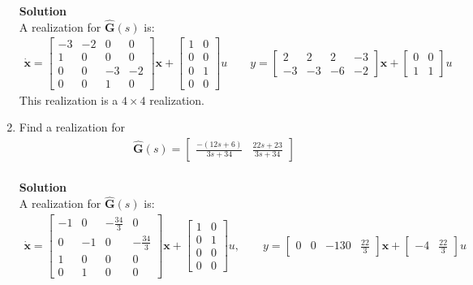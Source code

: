 \documentclass[11pt]{article}
\begin{document}
\begin{enumerate}
{	\textbf{Solution}\\
	A realization for $\hat{\mathbf{G}}(s)$ is:
	\begin{align*}
		\dot{\mathbf{x}}=\left[\begin{array}{cc|cc}-3 & -2 & 0 & 0 \\1 & 0 & 0 & 0 \\\hline 0 & 0 & -3 & -2 \\0 & 0 & 1 & 0\end{array}\right]\mathbf{x}+\left[\begin{array}{cc}1 & 0 \\0 & 0 \\\hline 0 & 1 \\0 & 0\end{array}\right]u \quad \quad y=\left[\begin{array}{cc|cc}2 & 2 & 2 & -3 \\\hline -3 & -3 & -6 & -2\end{array}\right]\mathbf{x}+\left[\begin{array}{cc}0 & 0 \\\hline 1 & 1\end{array}\right]u
	\end{align*}
	This realization is a $4\times4$ realization.
	}
	
	\newpage
	\item{Find a realization for
		\begin{align*}
			\hat{\mathbf{G}}(s)=\left[\begin{array}{cc}\frac{-(12s+6)}{3s+34} & \frac{22s+23}{3s+34}\end{array}\right]
		\end{align*}
	\\
	
	\textbf{Solution}\\
	A realization for $\hat{\mathbf{G}}(s)$ is:
	\begin{align*}
		\dot{\mathbf{x}}=\left[\begin{array}{cc|cc}-1 & 0 & -\frac{34}{3} & 0 \\ 0 & -1 & 0 & -\frac{34}{3} \\\hline 1 & 0 & 0 & 0 \\ 0 & 1 & 0 & 0\end{array}\right]\mathbf{x}+\left[\begin{array}{cc}1 & 0 \\0 & 1 \\\hline 0 & 0 \\0 & 0\end{array}\right]u, \quad \quad y=\left[\begin{array}{cc|cc}0 & 0 & -130 & \frac{22}{3}\end{array}\right]\mathbf{x}+\left[\begin{array}{cc}-4 & \frac{22}{3}\end{array}\right]u
	\end{align*}
	}
	

\end{enumerate}
\end{document}
